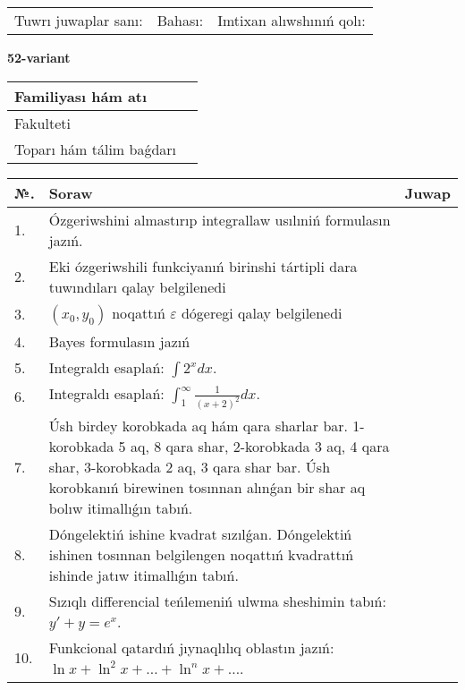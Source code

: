\documentclass{article}
\begin{document}
\vspace{1cm}

\begin{tabular}{ c c c }
Tuwrı juwaplar sanı: \underline{\hspace{2cm}} & Bahası: \underline{\hspace{2cm}} & Imtixan alıwshınıń qolı: \underline{\hspace{2cm}} \\
\end{tabular}

\newpage

\begin{center}\textbf{52-variant}\end{center}

\bgroup
\def\arraystretch{1.5}
\begin{tabular}{ |m{6cm}|m{10cm}| }
  \hline
  Familiyası hám atı & \\
  \hline
  Fakulteti &\\
  \hline
  Toparı hám tálim baǵdarı & \\
  \hline
\end{tabular}
\egroup

\vspace{0.5cm}

\bgroup
\def\arraystretch{2}
\begin{tabular}{ |l|m{8cm}|m{7cm}| }
  \hline
  №. & Soraw & Juwap \\
  \hline
  1. & Ózgeriwshini almastırıp integrallaw usılıniń formulasın jazıń. &  \\
  \hline
  2. & Eki ózgeriwshili funkciyanıń birinshi tártipli dara tuwındıları qalay belgilenedi &  \\
  \hline
  3. & $(x_{0} , y_{0})$ noqattıń $\varepsilon$ dógeregi qalay belgilenedi &  \\
  \hline
  4. & Bayes formulasın jazıń &  \\
  \hline
  5. & Integraldı esaplań: $\displaystyle\int {2^{x}dx} $. &  \\
  \hline
  6. & Integraldı esaplań: $\displaystyle\int_{1}^{\infty}{\frac{1}{\left( x + 2 \right)^{2}}dx }$. &  \\
  \hline
  7. & Úsh birdey korobkada aq hám qara sharlar bar. 1-korobkada 5 aq, 8 qara shar, 2-korobkada 3 aq, 4 qara shar, 3-korobkada 2 aq, 3 qara shar bar. Úsh korobkanıń birewinen tosınnan alınǵan bir shar aq bolıw itimallıǵın tabıń. &  \\
  \hline
  8. & Dóngelektiń ishine kvadrat sızılǵan. Dóngelektiń ishinen tosınnan belgilengen noqattıń kvadrattıń ishinde jatıw itimallıǵın tabıń. &  \\
  \hline
  9. & Sızıqlı differencial teńlemeniń ulwma sheshimin tabıń: $y' + y =e^{x}$. &  \\
  \hline
  10. & Funkcional qatardıń jıynaqlılıq oblastın jazıń: $\ln x + \ln^{2}x + \ldots + \ln^{n}x + \ldots$. &  \\
  \hline
\end{tabular}
\egroup
\end{document}
